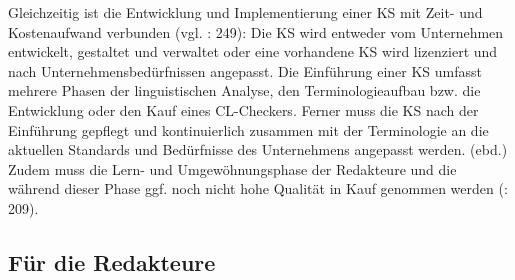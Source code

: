 Gleichzeitig ist die Entwicklung und Implementierung einer KS mit Zeit- und Kostenaufwand verbunden (vgl. \citealt{NybergEtAl2003}: 249): Die KS wird entweder vom Unternehmen entwickelt, gestaltet und verwaltet oder eine vorhandene KS wird lizenziert und nach Unternehmensbedürfnissen angepasst. Die Einführung einer KS umfasst mehrere Phasen der linguistischen Analyse, den Terminologieaufbau bzw. die Entwicklung oder den Kauf eines CL-Checkers. Ferner muss die KS nach der Einführung gepflegt und kontinuierlich zusammen mit der Terminologie an die aktuellen Standards und Bedürfnisse des Unternehmens angepasst werden. (ebd.) Zudem muss die Lern- und Umgewöhnungsphase der Redakteure und die während dieser Phase ggf. noch nicht hohe Qualität in Kauf genommen werden (\citealt{DrewerZiegler2014}: 209).

\subsection{Für die Redakteure}


